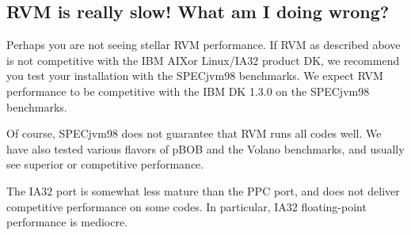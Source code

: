 \subsection{RVM is really slow! What am I doing wrong?}


Perhaps you are not seeing stellar RVM performance.  If RVM as
described above is not competitive with the IBM AIX\AIXTMFootnote or
Linux/IA32 product DK, we recommend you test your installation with
the SPECjvm98 benchmarks.  We expect RVM performance to be competitive
with the IBM DK 1.3.0 on the SPECjvm98 benchmarks.

Of course, SPECjvm98 does not guarantee that RVM runs all codes
well.  We have also tested various flavors of pBOB and the Volano
benchmarks, and usually see superior or competitive performance.

The IA32 port is somewhat less mature than the PPC port, and does not
deliver competitive performance on some codes.  In particular, IA32
floating-point performance is mediocre.


